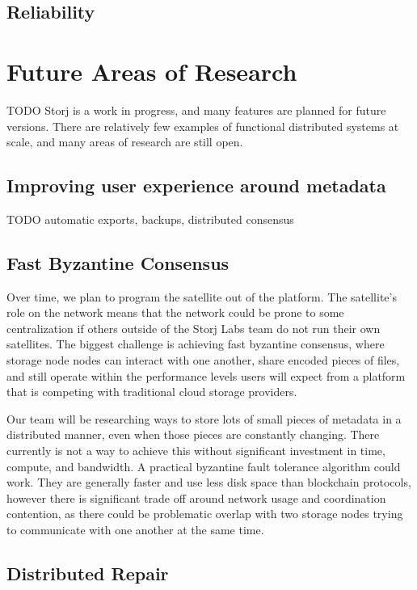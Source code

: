 \documentclass[a4paper,10pt]{article} \usepackage[utf8]{inputenc}
\newcommand{\todo}[1]{{\color{red} TODO #1 }}
\begin{document}
\subsection{Reliability}

\section{Future Areas of Research}\label{sec:future_work}

\todo{ Storj is a work in progress, and many features are planned for future
versions. There are relatively few examples of functional distributed systems at
scale, and many areas of research are still open. }

\subsection{Improving user experience around metadata}

\todo{automatic exports, backups, distributed consensus}

\subsection{Fast Byzantine Consensus}

Over time, we plan to program the satellite out of the platform.
The satellite's role on the network means that the network could be prone
to some
centralization if others outside of the Storj Labs team do not run their own
satellites. The biggest challenge is achieving fast byzantine consensus,
where storage node nodes can interact with one another, share encoded pieces of
files,
and still operate within the performance levels users will expect from a
platform that is competing with traditional cloud storage providers.

Our team will be researching ways to store lots of small pieces of metadata
in a distributed manner, even when those pieces are constantly changing. There
currently is not a way to achieve this without significant investment in time,
compute, and bandwidth. A practical byzantine fault tolerance algorithm could
work. They are generally faster and use less disk space than blockchain
protocols, however there is significant trade off around network usage and
coordination contention, as there could be problematic overlap with two storage
nodes trying to communicate with one another at the same time.

\subsection{Distributed Repair}
\end{document}
